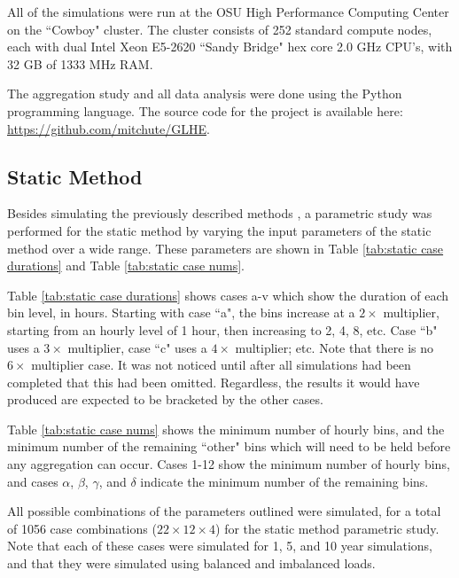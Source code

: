 \documentclass[review,12pt]{elsarticle}
\begin{document}
All of the simulations were run at the OSU High Performance Computing Center on the ``Cowboy" cluster. The cluster consists of 252 standard compute nodes, each with dual Intel Xeon E5-2620 ``Sandy Bridge" hex core 2.0 GHz CPU's, with 32 GB of 1333 MHz RAM.

The aggregation study and all data analysis were done using the Python programming language. The source code for the project is available here: \url{https://github.com/mitchute/GLHE}.

\subsection{Static Method}
\label{subsec:agg:method:static}

Besides simulating the previously described methods \citep{YavuzturkSpitler1999, BernierPinelLabibPaillot2004, Liu2005}, a parametric study was performed for the static method by varying the input parameters of the static method over a wide range. These parameters are shown in Table \ref{tab:static case durations} and Table \ref{tab:static case nums}.

Table \ref{tab:static case durations} shows cases a-v which show the duration of each bin level, in hours. Starting with case ``a", the bins increase at a $2\times$ multiplier, starting from an hourly level of 1 hour, then increasing to 2, 4, 8, etc. Case ``b" uses a $3\times$ multiplier, case ``c" uses a $4\times$ multiplier; etc. Note that there is no $6\times$ multiplier case. It was not noticed until after all simulations had been completed that this had been omitted. Regardless, the results it would have produced are expected to be bracketed by the other cases.

Table \ref{tab:static case nums} shows the minimum number of hourly bins, and the minimum number of the remaining ``other" bins which will need to be held before any aggregation can occur. Cases 1-12 show the minimum number of hourly bins, and cases $\alpha$, $\beta$, $\gamma$, and $\delta$ indicate the minimum number of the remaining bins.

All possible combinations of the parameters outlined were simulated, for a total of 1056 case combinations ($22 \times 12 \times 4$) for the static method parametric study. Note that each of these cases were simulated for 1, 5, and 10 year simulations, and that they were simulated using balanced and imbalanced loads.
\end{document}
